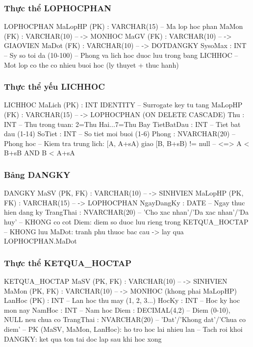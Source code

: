 \documentclass[13pt, a4paper]{article}
\begin{document}
\subsubsection{Thực thể LOPHOCPHAN}
\begin{sqlbox}
LOPHOCPHAN {
   MaLopHP (PK) : VARCHAR(15)   -- Ma lop hoc phan
   MaMon (FK)   : VARCHAR(10)   -- -> MONHOC
   MaGV (FK)    : VARCHAR(10)   -- -> GIAOVIEN
   MaDot (FK)   : VARCHAR(10)   -- -> DOTDANGKY
   SysoMax      : INT           -- Sy so toi da (10-100)
   -- Phong va lich hoc duoc luu trong bang LICHHOC
   -- Mot lop co the co nhieu buoi hoc (ly thuyet + thuc hanh)
}
\end{sqlbox}

\subsubsection{Thực thể yếu LICHHOC}
\begin{sqlbox}
LICHHOC {
   MaLich (PK)  : INT IDENTITY   -- Surrogate key tu tang
   MaLopHP (FK) : VARCHAR(15)    -- -> LOPHOCPHAN (ON DELETE CASCADE)
   Thu          : INT             -- Thu trong tuan: 2=Thu Hai...7=Thu Bay
   TietBatDau   : INT             -- Tiet bat dau (1-14)
   SoTiet       : INT             -- So tiet moi buoi (1-6)
   Phong        : NVARCHAR(20)    -- Phong hoc
   -- Kiem tra trung lich: [A, A+sA) giao [B, B+sB) != null
   -- <=> A < B+sB AND B < A+sA
}
\end{sqlbox}

\subsubsection{Bảng DANGKY}
\begin{sqlbox}
DANGKY {
   MaSV (PK, FK)    : VARCHAR(10)   -- -> SINHVIEN
   MaLopHP (PK, FK) : VARCHAR(15)   -- -> LOPHOCPHAN
   NgayDangKy       : DATE          -- Ngay thuc hien dang ky
   TrangThai        : NVARCHAR(20)  -- 'Cho xac nhan'/'Da xac nhan'/'Da huy'
   -- KHONG co cot Diem: diem so duoc luu rieng trong KETQUA_HOCTAP
   -- KHONG luu MaDot: tranh phu thuoc bac cau -> lay qua LOPHOCPHAN.MaDot
}
\end{sqlbox}

\subsubsection{Thực thể KETQUA\_HOCTAP}
\begin{sqlbox}
KETQUA_HOCTAP {
   MaSV (PK, FK)  : VARCHAR(10)   -- -> SINHVIEN
   MaMon (PK, FK) : VARCHAR(10)   -- -> MONHOC (khong phai MaLopHP)
   LanHoc (PK)    : INT           -- Lan hoc thu may (1, 2, 3...)
   HocKy          : INT           -- Hoc ky hoc mon nay
   NamHoc         : INT           -- Nam hoc
   Diem           : DECIMAL(4,2)  -- Diem (0-10), NULL neu chua co
   TrangThai      : NVARCHAR(20)  -- 'Dat'/'Khong dat'/'Chua co diem'
   -- PK (MaSV, MaMon, LanHoc): ho tro hoc lai nhieu lan
   -- Tach roi khoi DANGKY: ket qua ton tai doc lap sau khi hoc xong
}
\end{sqlbox}
\end{document}
